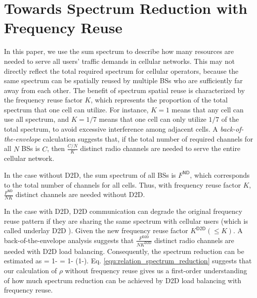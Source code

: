 
\section{Towards Spectrum Reduction with Frequency Reuse} \label{sec:towards_spectrum_reduction}
In this paper, we use the sum spectrum to describe how many resources are needed to
serve all users' traffic demands in cellular networks.
This may not directly reflect the total required spectrum for cellular operators, because
the same spectrum can be spatially reused by multiple BSs who are sufficiently far away from each other.
The benefit of spectrum spatial reuse is characterized by the
frequency reuse factor $K$, which represents the proportion of the total
spectrum that one cell can utilize. For instance, $K=1$ means that any cell
can use all spectrum, and $K=1/7$ means that one cell can only utilize $1/7$ of the total spectrum,
to avoid excessive interference among adjacent cells.
A \emph{back-of-the-envelope} calculation suggests that, if the total number of required channels for all $N$  BSs is $C$,
then $\frac{C/N}{K}$ distinct radio channels are needed to serve the entire cellular
network.

In the case without D2D, the sum spectrum of all BSs is $F^{\textsf{ND}}$, which
corresponds to the total number of channels for all cells. Thus, with frequency reuse
factor $K$, $\frac{F^{\textsf{ND}}}{NK}$ distinct channels are needed without D2D.

In the case with D2D, D2D communication can degrade the original frequency reuse pattern
if they are sharing the same spectrum with cellular users (which is called underlay D2D \cite{Doppler09}).
Given the new frequency reuse factor $K^{\textsf{D2D}} (\le K)$. A back-of-the-envelope analysis suggests that
$\frac{F^{\textsf{D2D}}}{NK^{\textsf{D2D}}}$ distinct radio channels are needed with D2D load balancing. Consequently,
the spectrum reduction can be estimated as
\be
{}
= 1-  \times {}
= 1-  (1-\rho).
\label{equ:relation_spectrum_reduction}
\ee
Eq. \eqref{equ:relation_spectrum_reduction} suggests that our calculation of $\rho$ without frequency reuse
gives us a first-order understanding of how much spectrum reduction can be achieved by D2D load balancing with frequency reuse.
